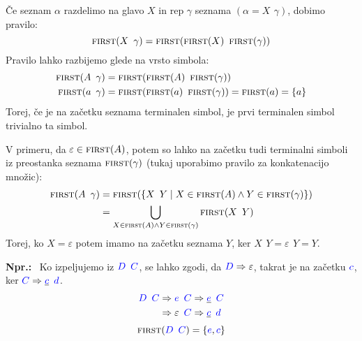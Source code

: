 \documentclass{article}
\newcommand{\Ex}{\textbf{Npr.:}\ }
\newcommand{\FIRST}{\textsc{first}}
\newcommand{\Symbol}[1]{\textcolor{blue}{#1}}
\newcommand{\Null}{\varepsilon}
\newcommand{\Derive}{\Rightarrow}
\newcommand{\Seq}{{\ \,}}
\begin{document}
Če seznam $\alpha$ razdelimo na glavo $X$ in rep $\gamma$ seznama ${(\alpha = X \Seq \gamma)}$, dobimo pravilo:
\begin{equation*}
  \FIRST(X \Seq \gamma) = \FIRST(\FIRST(X) \Seq \FIRST(\gamma))
\end{equation*}
Pravilo lahko razbijemo glede na vrsto simbola:
\begin{align*}
  \FIRST(A \Seq \gamma) &= \FIRST(\FIRST(A) \Seq \FIRST(\gamma))\\
  \FIRST(a \Seq \gamma) &= \FIRST(\FIRST(a) \Seq \FIRST(\gamma)) = \FIRST(a) = \{a\}
\end{align*}
Torej, če je na začetku seznama terminalen simbol, je prvi terminalen simbol trivialno ta simbol.

V primeru, da $\varepsilon \in \FIRST(A)$, potem so lahko na začetku tudi terminalni simboli iz preostanka seznama $\FIRST(\gamma)$ (tukaj uporabimo pravilo za konkatenacijo množic):
\begin{align*}
  \FIRST(A \Seq \gamma) &= \FIRST(\{X \Seq Y \mid X \in \FIRST(A) \land Y \in \FIRST(\gamma)\})\\
   &= \bigcup_{X \in \FIRST(A) \land Y \in \FIRST(\gamma)} \FIRST(X \Seq Y)
\end{align*}
Torej, ko $X = \Null$ potem imamo na začetku seznama $Y$, ker $X \Seq Y = \Null \Seq Y = Y$.

\Ex
  Ko izpeljujemo iz $\Symbol{D} \Seq \Symbol{C}$, se lahko zgodi, da $\Symbol{D} \Derive \Null$, takrat je na začetku $\Symbol{c}$, ker $\Symbol{C} \Derive \underline{\Symbol{c}} \Seq \Symbol{d}$. 
  \begin{equation*}
    \Symbol{D} \Seq \Symbol{C} \begin{aligned}[t]
      &\Derive \Symbol{e} \Seq \Symbol{C} \Derive \underline{\Symbol{e}} \Seq \Symbol{C} \\
      &\Derive \Null \Seq \Symbol{C} \Derive \underline{\Symbol{c}} \Seq \Symbol{d} \\
    \end{aligned}
  \end{equation*}
  \begin{equation*}
    \FIRST(\Symbol{D} \Seq \Symbol{C}) = \{\Symbol{e}, \Symbol{c}\}
  \end{equation*}
\end{document}
